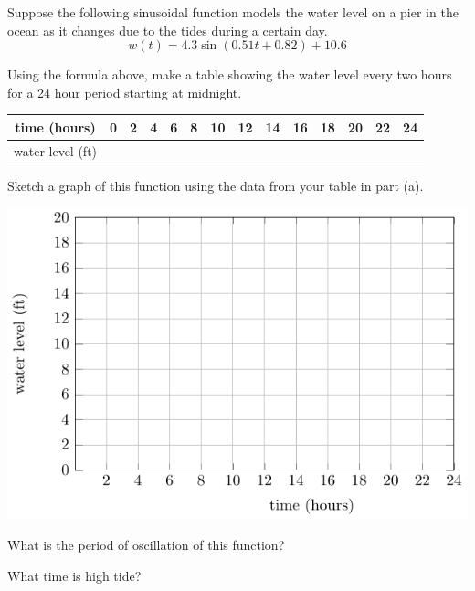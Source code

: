 \begin{activity}\label{A:0.5.2}
Suppose the following sinusoidal function models the water level on a pier in the ocean as
it changes due to the tides during a certain day.
\[ w(t) = 4.3 \sin \left( 0.51 t + 0.82 \right) + 10.6 \]
\ba
\item Using the formula above, make a table showing the water level every two hours for a 24 hour period starting at midnight.
    \begin{center}
        \begin{tabular}[h!]{|c||c|c|c|c|c|c|c|c|c|c|c|c|c|}
            \hline
            time (hours) & 0 & 2 & 4 & 6 & 8 & 10 & 12 & 14 & 16 & 18 & 20 & 22 & 24 \\
            \hline
            water level (ft) & & & & & & & & & & & & & \\ \hline
        \end{tabular}
    \end{center}
\item Sketch a graph of this function using the data from your table in part (a).
    \begin{center}
        \includegraphics[width=0.6\columnwidth]{figures/0-5-fig10.pdf}
    \end{center}
\item What is the period of oscillation of this function? %
\item What time is high tide?  %

\ea
\end{activity}\aftera
